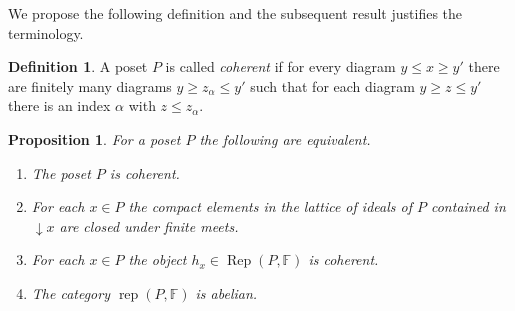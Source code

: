\documentclass[a4paper]{amsart}
\theoremstyle{plain}
\newtheorem{prop}[thm]{Proposition}
\theoremstyle{definition}
\newtheorem{defn}[thm]{Definition}
\theoremstyle{remark}
\numberwithin{equation}{section}
\newcommand{\rep}{\operatorname{rep}}
\newcommand{\Rep}{\operatorname{Rep}}
\def\bbF{\mathbb F}
\begin{document}
We propose the following definition and the subsequent result
justifies the terminology.

\begin{defn}
A poset $P$ is called \emph{coherent} if for every diagram $y\le x\ge
y'$ there are finitely many diagrams $y\ge z_\alpha\le y'$ such that for each
diagram $y\ge z\le y'$ there is an index $\alpha$ with  $z\le z_\alpha$. 
\end{defn}

\begin{prop}\label{pr:coherent}
  For a poset $P$ the following are equivalent.
\begin{enumerate}
\item The poset $P$ is coherent.
\item For each $x\in P$ the compact elements in the lattice of ideals
  of $P$ contained in $\downarrow\! x$ are closed under finite meets.
\item For each $x\in P$ the object $h_x\in\Rep(P,\bbF)$ is coherent.
\item The category $\rep(P,\bbF)$ is abelian.
\end{enumerate}
\end{prop}
\end{document}
